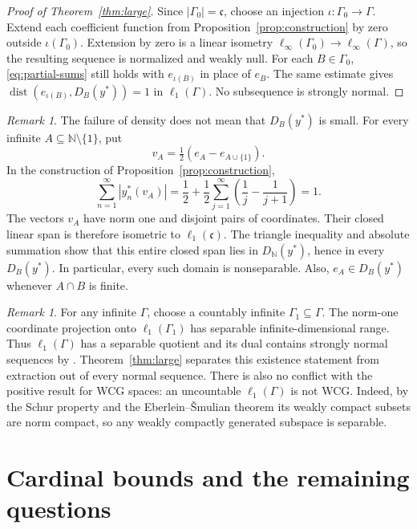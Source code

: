\documentclass[11pt,a4paper]{amsart}
\theoremstyle{remark}
\newtheorem{remark}[theorem]{Remark}
\newcommand{\N}{\mathbb N}
\newcommand{\cfrak}{\mathfrak c}
\DeclareMathOperator{\dist}{dist}
\begin{document}
\begin{proof}[Proof of Theorem~\ref{thm:large}]
Since $|\Gamma_0|=\cfrak$, choose an injection
$\iota:\Gamma_0\to\Gamma$. Extend each coefficient function from
Proposition~\ref{prop:construction} by zero outside $\iota(\Gamma_0)$.
Extension by zero is a linear isometry
$\ell_\infty(\Gamma_0)\to\ell_\infty(\Gamma)$, so the resulting
sequence is normalized and weakly null. For each $B\in\Gamma_0$,
\eqref{eq:partial-sums} still holds with $e_{\iota(B)}$ in place of
$e_B$. The same estimate gives
$\dist(e_{\iota(B)},D_B(y^*))=1$ in $\ell_1(\Gamma)$.
No subsequence is strongly normal.
\end{proof}

\begin{remark}\label{rem:domains}
The failure of density does not mean that $D_B(y^*)$ is small.
For every infinite $A\subseteq\N\setminus\{1\}$, put
\[
 v_A=\tfrac12(e_A-e_{A\cup\{1\}}).
\]
In the construction of Proposition~\ref{prop:construction},
\[
 \sum_{n=1}^{\infty}|y_n^*(v_A)|
 =\frac12+\frac12\sum_{j=1}^{\infty}
                  \left(\frac1j-\frac1{j+1}\right)=1.
\]
The vectors $v_A$ have norm one and disjoint pairs of coordinates.
Their closed linear span is therefore isometric to $\ell_1(\cfrak)$.
The triangle inequality and absolute summation show that this entire
closed span lies in $D_{\N}(y^*)$, hence in every $D_B(y^*)$.
In particular, every such domain is nonseparable. Also,
$e_A\in D_B(y^*)$ whenever $A\cap B$ is finite.
\end{remark}

\begin{remark}\label{rem:context}
For any infinite $\Gamma$, choose a countably infinite
$\Gamma_1\subseteq\Gamma$. The norm-one coordinate projection onto
$\ell_1(\Gamma_1)$ has separable infinite-dimensional range. Thus
$\ell_1(\Gamma)$ has a separable quotient and its dual contains
strongly normal sequences by \cite[Theorem~3]{Sliwa}. Theorem~\ref{thm:large}
separates this existence statement from extraction out of every normal
sequence. There is also no conflict with the positive result for WCG
spaces: an uncountable $\ell_1(\Gamma)$ is not WCG. Indeed, by the
Schur property and the Eberlein--\v{S}mulian theorem its weakly compact
subsets are norm compact, so any weakly compactly generated subspace
is separable.
\end{remark}

\section{Cardinal bounds and the remaining questions}\label{sec:density}
\end{document}
